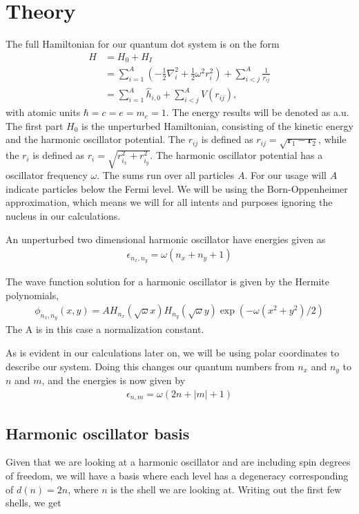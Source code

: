 \documentclass[11pt]{article}
\begin{document}
\section{Theory}
The full Hamiltonian for our quantum dot system is on the form
\begin{align}
	H &= H_0 + H_I \nonumber \\
	&= \sum^A_{i=1} \left( -\frac{1}{2}\nabla^2_i + \frac{1}{2}\omega^2 r^2_i \right) + \sum^A_{i<j}\frac{1}{r_{ij}} \\
	&= \sum^A_{i=1} \hat{h}_{i,0} + \sum^A_{i<j}V(r_{ij}),
	\label{eq:full-hamiltonian}
\end{align}
with atomic units $\hbar = c = e = m_e = 1$. The energy results will be denoted as a.u. The first part $H_0$ is the unperturbed Hamiltonian, consisting of the kinetic energy and the harmonic oscillator potential. The $r_{ij}$ is defined as $r_{ij} = \sqrt{\mathbf{r}_1 - \mathbf{r}_2}$, while the $r_i$ is defined as $r_i = \sqrt{r^2_{i_x} + r^2_{i_y}}$. The harmonic oscillator potential has a oscillator frequency $\omega$. The sums run over all particles $A$. For our usage will $A$ indicate particles below the Fermi level. We will be using the Born-Oppenheimer approximation, which means we will for all intents and purposes ignoring the nucleus in our calculations.

An unperturbed two dimensional harmonic oscillator have energies given as
\begin{align}
	\epsilon_{n_x,n_y} = \omega(n_x + n_y + 1)
	\label{eq:ho-energy-cartesian}
\end{align}

The wave function solution for a harmonic oscillator is given by the Hermite polynomials,
\begin{align}
	\phi_{n_x,n_y}(x,y) = AH_{n_x}(\sqrt{\omega}x)H_{n_y}(\sqrt{\omega}y)\exp(-\omega(x^2 + y^2)/2)
\end{align}
The A is in this case a normalization constant.

As is evident in our calculations later on, we will be using polar coordinates to describe our system. Doing this changes our quantum numbers from $n_x$ and $n_y$ to $n$ and $m$, and the energies is now given by
\begin{align}
	\epsilon_{n, m} = \omega(2n + |m| + 1)
	\label{eq:ho-energy-polar}
\end{align}

\subsection{Harmonic oscillator basis}
Given that we are looking at a harmonic oscillator and are including spin degrees of freedom, we will have a basis where each level has a degeneracy corresponding of $d(n)=2n$, where $n$ is the shell we are looking at. Writing out the first few shells, we get
\end{document}
